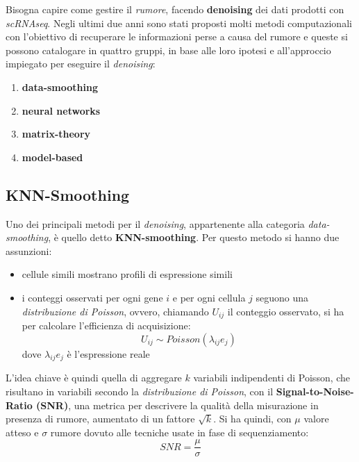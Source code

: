 \documentclass[a4paper,12pt, oneside]{book}
\begin{document}
Bisogna capire come gestire il \textit{rumore}, facendo \textbf{denoising} dei
dati prodotti con \textit{scRNAseq}. Negli ultimi due anni sono stati proposti
molti metodi computazionali con l'obiettivo di recuperare le informazioni perse
a causa del rumore e queste si possono catalogare in quattro gruppi, in base
alle loro ipotesi e all'approccio impiegato per eseguire il \textit{denoising}:
\begin{enumerate}
  \item \textbf{data-smoothing}
  \item \textbf{neural networks}
  \item \textbf{matrix-theory}
  \item \textbf{model-based}
\end{enumerate}
\subsection{KNN-Smoothing}
Uno dei principali metodi per il \textit{denoising}, appartenente alla
categoria \textit{data-smoothing},  è quello detto
\textbf{KNN-smoothing}. Per questo metodo si hanno due assunzioni:
\begin{itemize}
  \item cellule simili mostrano profili di espressione simili
  \item i conteggi osservati per ogni gene $i$ e per ogni cellula $j$ seguono
  una \textit{distribuzione di Poisson}, ovvero, chiamando $U_{ij}$ il conteggio
  osservato, si ha per calcolare l'efficienza di acquisizione:
  \[U_{ij}\sim Poisson(\lambda_{ij}e_j)\]
  dove $\lambda_{ij}e_j$ è l'espressione reale
\end{itemize}
L'idea chiave è quindi quella di aggregare $k$ variabili indipendenti di
Poisson, che risultano in variabili secondo la \textit{distribuzione di
  Poisson}, con il \textbf{Signal-to-Noise-Ratio (SNR)}, una metrica per
descrivere la qualità della misurazione in presenza di rumore, aumentato di un
fattore $\sqrt{k}$. Si ha quindi, con $\mu$ valore atteso e $\sigma$ rumore
dovuto alle tecniche usate in fase di sequenziamento:
\[SNR=\frac{\mu}{\sigma}\]
\end{document}
